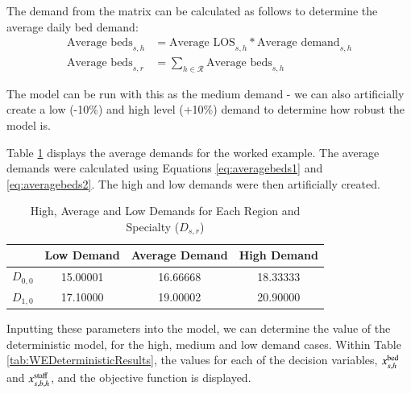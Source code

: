 \documentclass[../thesis.tex]{subfiles}
\begin{document}
{The demand from the matrix can be calculated as follows to determine the average daily bed demand:
\begin{align} 
    \text{Average beds}_{s,h} &= \text{Average LOS}_{s,h} * \text{Average demand}_{s,h}\label{eq:averagebeds1} \\ 
    \text{Average beds}_{s,r} &= \sum_{h \in \mathcal{R}} \text{Average beds}_{s,h} \label{eq:averagebeds2}
\end{align}

The model can be run with this as the medium demand - we can also artificially create a low (-10\%) and high level (+10\%) demand to determine how robust the model is.

Table \ref{tab:WEDemands} displays the average demands for the worked example. The average demands were calculated using Equations \eqref{eq:averagebeds1} and \eqref{eq:averagebeds2}. The high and low demands were then artificially created.

\begin{table}[h!]
    \centering
    \begin{tabular}{cccc}\toprule
       & \textbf{Low Demand}  & \textbf{Average Demand} & \textbf{High Demand} \\\midrule
       \textbf{$D_{0,0}$}  & 15.00001 &16.66668 & 18.33333  \\
       \textbf{$D_{1,0}$} & 17.10000 &19.00002 & 20.90000 \\ \bottomrule
    \end{tabular}
    \caption{High, Average and Low Demands for Each Region and Specialty ($D_{s,r}$)}
    \label{tab:WEDemands}
\end{table}

Inputting these parameters into the model, we can determine the value of the deterministic model, for the high, medium and low demand cases. Within Table \ref{tab:WEDeterministicResults}, the values for each of the decision variables, $x^\textnormal{bed}_{s,h}$ and $x^\textnormal{staff}_{s,b,h}$, and the objective function is displayed.


}
\end{document}
